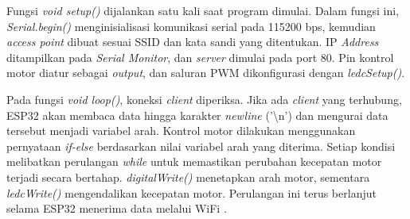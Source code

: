 Fungsi \emph{void setup()} dijalankan satu kali saat program dimulai. Dalam fungsi ini, \emph{Serial.begin()} menginisialisasi komunikasi serial pada 115200 bps, kemudian \emph{access point} dibuat sesuai SSID dan kata sandi yang ditentukan. IP \emph{Address} ditampilkan pada \emph{Serial Monitor}, dan \emph{server} dimulai pada port 80. Pin kontrol motor diatur sebagai \emph{output}, dan saluran PWM dikonfigurasi dengan \emph{ledcSetup()}.

Pada fungsi \emph{void loop()}, koneksi \emph{client} diperiksa. Jika ada \emph{client} yang terhubung, ESP32 akan membaca data hingga karakter \emph{newline} ('\textbackslash n') dan mengurai data tersebut menjadi variabel arah. Kontrol motor dilakukan menggunakan pernyataan \emph{if-else} berdasarkan nilai variabel arah yang diterima. Setiap kondisi melibatkan perulangan \emph{while} untuk memastikan perubahan kecepatan motor terjadi secara bertahap. \emph{digitalWrite()} menetapkan arah motor, sementara \emph{ledcWrite()} mengendalikan kecepatan motor. Perulangan ini terus berlanjut selama ESP32 menerima data melalui WiFi \parencite{ekatama2024perancangan}.